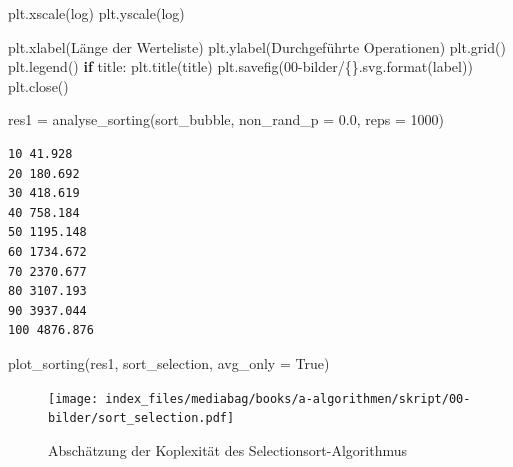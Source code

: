 \documentclass[
  letterpaper,
  DIV=11,
  numbers=noendperiod]{scrreprt}
\newenvironment{Shaded}{\begin{snugshade}}{\end{snugshade}}
\newcommand{\BuiltInTok}[1]{\textcolor[rgb]{0.00,0.23,0.31}{#1}}
\newcommand{\ControlFlowTok}[1]{\textcolor[rgb]{0.00,0.23,0.31}{\textbf{#1}}}
\newcommand{\DecValTok}[1]{\textcolor[rgb]{0.68,0.00,0.00}{#1}}
\newcommand{\FloatTok}[1]{\textcolor[rgb]{0.68,0.00,0.00}{#1}}
\newcommand{\NormalTok}[1]{\textcolor[rgb]{0.00,0.23,0.31}{#1}}
\newcommand{\OperatorTok}[1]{\textcolor[rgb]{0.37,0.37,0.37}{#1}}
\newcommand{\SpecialCharTok}[1]{\textcolor[rgb]{0.37,0.37,0.37}{#1}}
\newcommand{\StringTok}[1]{\textcolor[rgb]{0.13,0.47,0.30}{#1}}
\newcommand{\VariableTok}[1]{\textcolor[rgb]{0.07,0.07,0.07}{#1}}
\begin{document}
\begin{Shaded}
\begin{Highlighting}[]
\NormalTok{    plt.xscale(}\StringTok{\textquotesingle{}log\textquotesingle{}}\NormalTok{)}
\NormalTok{    plt.yscale(}\StringTok{\textquotesingle{}log\textquotesingle{}}\NormalTok{)}

\NormalTok{    plt.xlabel(}\StringTok{\textquotesingle{}Länge der Werteliste\textquotesingle{}}\NormalTok{)}
\NormalTok{    plt.ylabel(}\StringTok{\textquotesingle{}Durchgeführte Operationen\textquotesingle{}}\NormalTok{)}
\NormalTok{    plt.grid()}
\NormalTok{    plt.legend()}
    \ControlFlowTok{if}\NormalTok{ title:}
\NormalTok{        plt.title(title)}
\NormalTok{    plt.savefig(}\StringTok{\textquotesingle{}00{-}bilder/}\SpecialCharTok{\{\}}\StringTok{.svg\textquotesingle{}}\NormalTok{.}\BuiltInTok{format}\NormalTok{(label))}
\NormalTok{    plt.close()}
\end{Highlighting}
\end{Shaded}

\begin{Shaded}
\begin{Highlighting}[]
\NormalTok{res1 }\OperatorTok{=}\NormalTok{ analyse\_sorting(sort\_bubble, non\_rand\_p }\OperatorTok{=} \FloatTok{0.0}\NormalTok{, reps }\OperatorTok{=} \DecValTok{1000}\NormalTok{)}
\end{Highlighting}
\end{Shaded}

\begin{verbatim}
10 41.928
20 180.692
30 418.619
40 758.184
50 1195.148
60 1734.672
70 2370.677
80 3107.193
90 3937.044
100 4876.876
\end{verbatim}

\begin{Shaded}
\begin{Highlighting}[]
\NormalTok{plot\_sorting(res1, }\StringTok{\textquotesingle{}sort\_selection\textquotesingle{}}\NormalTok{, avg\_only }\OperatorTok{=} \VariableTok{True}\NormalTok{)}
\end{Highlighting}
\end{Shaded}

\begin{figure}[H]

{\centering \texttt{[image: index\_files/mediabag/books/a-algorithmen/skript/00-bilder/sort\_selection.pdf]}

}

\caption{Abschätzung der Koplexität des Selectionsort-Algorithmus}

\end{figure}%
\end{document}
